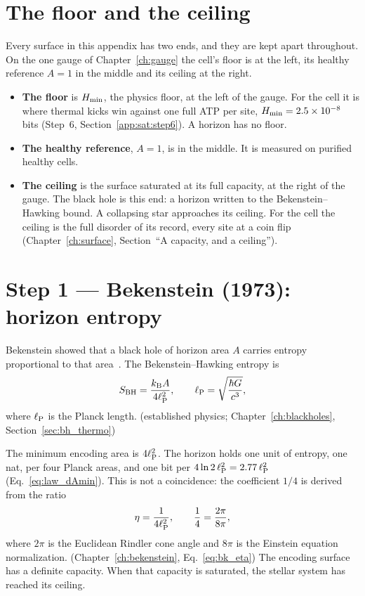 \section{The floor and the ceiling}\label{app:sat:ends}
Every surface in this appendix has two ends, and they are kept apart throughout. On the one gauge of Chapter~\ref{ch:gauge} the cell's floor
is at the left, its healthy reference $A=1$ in the middle and its ceiling at the right.
\begin{itemize}
\item \textbf{The floor} is $H_{\min}$, the physics floor, at the left of the gauge. For the cell it is where thermal kicks win against one full ATP per site,
      $H_{\min}=2.5\times10^{-8}$ bits (Step~6, Section~\ref{app:sat:step6}). A horizon has no floor.
\item \textbf{The healthy reference}, $A=1$, is in the middle. It is measured on purified healthy cells.
\item \textbf{The ceiling} is the surface saturated at its full capacity, at the right of the gauge. The black hole is this end: a horizon written to the
      Bekenstein--Hawking bound. A collapsing star approaches its ceiling. For the cell the ceiling is the full disorder of its record, every
      site at a coin flip (Chapter~\ref{ch:surface}, Section~``A capacity, and a ceiling'').
\end{itemize}

\section{Step 1 --- Bekenstein (1973): horizon entropy}\label{app:sat:step1}
Bekenstein showed that a black hole of horizon area $A$ carries entropy proportional to that area~\cite{Bekenstein1973}. The
Bekenstein--Hawking entropy is
\begin{equation}
S_{\rm BH}=\frac{k_{\mathrm B} A}{4\ell_{\mathrm P}^2},\qquad \ell_{\mathrm P}=\sqrt{\frac{\hbar G}{c^3}}, \label{eq:sat_SBH}
\end{equation}
where $\ell_{\mathrm P}$ is the Planck length. \derived{} (established physics; Chapter~\ref{ch:blackholes}, Section~\ref{sec:bh_thermo})

The minimum encoding area is $4\ell_{\mathrm P}^2$. The horizon holds one unit of entropy, one nat, per four Planck areas, and one bit per
$4\ln2\,\ell_{\mathrm P}^2=2.77\,\ell_{\mathrm P}^2$ (Eq.~\eqref{eq:law_dAmin}). This is not a coincidence: the coefficient $1/4$ is derived from the ratio
\begin{equation}
\eta=\frac{1}{4\ell_{\mathrm P}^2},\qquad \frac14=\frac{2\pi}{8\pi}, \label{eq:sat_eta}
\end{equation}
where $2\pi$ is the Euclidean Rindler cone angle and $8\pi$ is the Einstein equation normalization. \derived{} (Chapter~\ref{ch:bekenstein},
Eq.~\eqref{eq:bk_eta}) The encoding surface has a definite capacity. When that capacity is saturated, the stellar system has reached its
ceiling.

